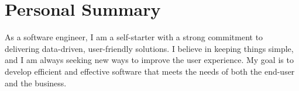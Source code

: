 \documentclass[10pt,a4paper,sans]{moderncv}
\begin{document}
\maketitle

\section{Personal Summary}
  \cvitem
    {}
    {As a software engineer, I am a self-starter with a strong commitment to delivering data-driven, user-friendly solutions. I believe in keeping things simple, and I am always seeking new ways to improve the user experience. My goal is to develop efficient and effective software that meets the needs of both the end-user and the business.}{}





\nocite{*}
%
%
\end{document}
